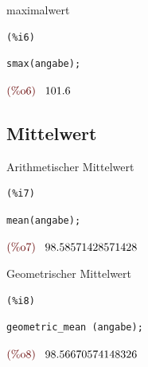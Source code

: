 \documentclass{article}
\begin{document}
maximalwert

\noindent
\begin{minipage}[t]{8ex}{\color{red}\bf
\begin{verbatim}
(%i6) 
\end{verbatim}}
\end{minipage}
\begin{minipage}[t]{\textwidth}{\color{blue}
\begin{verbatim}
smax(angabe);
\end{verbatim}}
\end{minipage}
\begin{math}\displaystyle
\parbox{8ex}{\color{labelcolor}(\%o6) }
101.6
\end{math}


\subsection{Mittelwert}


Arithmetischer Mittelwert

\noindent
\begin{minipage}[t]{8ex}{\color{red}\bf
\begin{verbatim}
(%i7) 
\end{verbatim}}
\end{minipage}
\begin{minipage}[t]{\textwidth}{\color{blue}
\begin{verbatim}
mean(angabe);
\end{verbatim}}
\end{minipage}
\begin{math}\displaystyle
\parbox{8ex}{\color{labelcolor}(\%o7) }
98.58571428571428
\end{math}

Geometrischer Mittelwert

\noindent
\begin{minipage}[t]{8ex}{\color{red}\bf
\begin{verbatim}
(%i8) 
\end{verbatim}}
\end{minipage}
\begin{minipage}[t]{\textwidth}{\color{blue}
\begin{verbatim}
geometric_mean (angabe);
\end{verbatim}}
\end{minipage}
\begin{math}\displaystyle
\parbox{8ex}{\color{labelcolor}(\%o8) }
98.56670574148326
\end{math}
\end{document}
